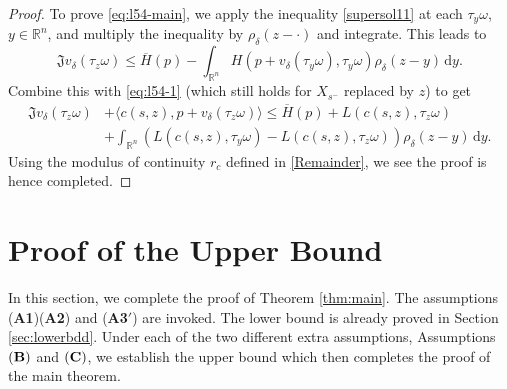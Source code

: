 \documentclass[11pt,reqno]{amsart}
\theoremstyle{definition}
\theoremstyle{remark}
\numberwithin{equation}{section}
\newcommand{\R}{{\mathbb{R}}}
\newcommand{\dd}{\mathrm{d}}
\newcommand{\ol}{\overline}
\begin{document}
\begin{proof}
To prove \eqref{eq:l54-main}, we apply the inequality \eqref{supersol11} at each $\tau_y\omega$, $y\in \R^n$, and multiply the inequality by $\rho_\delta(z-\cdot)$ and integrate. This leads to
\begin{equation*}
    \mathfrak{J}v_\delta(\tau_z\omega) \le \ol{H}(p) - \int_{\R^n} H(p+v_\delta(\tau_y\omega),\tau_y\omega)\rho_\delta(z-y)\,\dd y.
\end{equation*}
Combine this with \eqref{eq:l54-1} (which still holds for $X_{s^-}$ replaced by $z$) to get
\begin{equation*}
\begin{aligned}
    \mathfrak{J}v_\delta(\tau_z\omega) &+ \langle c(s,z),p+v_\delta(\tau_z\omega)\rangle \le \ol{H}(p) + L(c(s,z),\tau_z\omega) \\
    &+ \int_{\R^n} (L(c(s,z),\tau_y\omega)-L(c(s,z),\tau_z\omega))\rho_\delta(z-y)\,\dd y.
    \end{aligned}
\end{equation*}
Using the modulus of continuity $r_c$ defined in \eqref{Remainder}, we see the proof is hence completed.
\end{proof}


\section{Proof of the Upper Bound}
\label{sec:proofUB}

In this section, we complete the proof of Theorem \ref{thm:main}. The assumptions ({\bf A1})({\bf A2}) and ({\bf A3}$'$) are invoked. The lower bound is already proved in Section \ref{sec:lowerbdd}. Under each of the two different extra assumptions, Assumptions $({\bf B})$ and $({\bf C})$, we establish the upper bound which then completes the proof of the main theorem.
\end{document}
